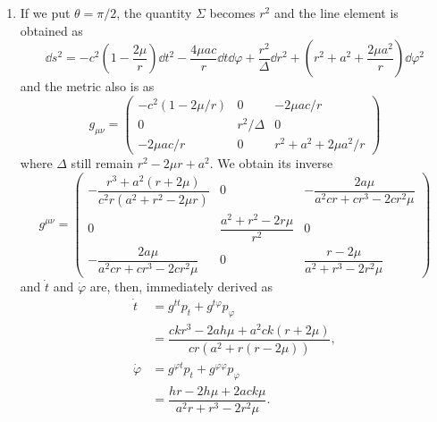 \documentclass[a4paper,pdftex,10pt]{article}
\begin{document}
\maketitle

\begin{enumerate}
  \item
        If we put $\theta=\pi/2$, the quantity $\Sigma$ becomes $r^2$ and the line element is obtained as
        \begin{equation}
          \dd s^2
          =
          -
          c^2
          \left( 1-\frac{2\mu}{r} \right)\dd t^2
          -
          \frac{4\mu ac}{r}\dd t\dd \varphi
          +
          \frac{r^2}{\Delta}\dd r^2
          +
          \left(
          r^2+a^2+\frac{2\mu a^2}{r}
          \right)
          \dd\varphi^2
        \end{equation}
        and the metric also is as
        \begin{equation}
          g_{\mu\nu}
          =
          \begin{pmatrix}
            -c^2(1-2\mu/r) & 0          & -2\mu ac/r           \\
            0              & r^2/\Delta & 0                    \\
            -2\mu ac/r     & 0          & r^2 + a^2 +2\mu a^2/r
          \end{pmatrix}
        \end{equation}
        where $\Delta$ still remain $r^2-2\mu r+a^2$. We obtain its inverse
        \begin{equation}
          g^{\mu\nu}
          =
          \begin{pmatrix}
            -\dfrac{r^3+a^2(r+2\mu)}{c^2 r(a^2+r^2-2\mu r)} & 0 & -\dfrac{2a\mu}{a^2 cr+cr^3-2cr^2\mu} \\
            0 & \dfrac{a^2+r^2-2r\mu}{r^2} & 0 \\
            -\dfrac{2a\mu}{a^2cr+cr^3-2cr^2\mu} & 0 & \dfrac{r-2\mu}{a^2+r^3-2r^2\mu}
          \end{pmatrix}
          \label{eqn:inverse_metric}
        \end{equation}
        and $\dot{t}$ and $\dot{\varphi}$ are, then, immediately derived as
        \begin{align}
          \dot{t}
          &=
          g^{tt}p_{t}+g^{t\varphi}p_{\varphi}
          \nonumber
          \\
          &=
          \dfrac{ckr^3-2ah\mu+a^2 ck(r+2\mu)}{cr(a^2+r(r-2\mu))}
          ,
          \\
          \dot{\varphi}
          &=
          g^{\varphi t}p_{t}+g^{\varphi\varphi}p_{\varphi}
          \nonumber
          \\
          &=
          \dfrac{hr-2h\mu+2ack\mu}{a^2r+r^3-2r^2\mu}
          .
        \end{align}



\end{enumerate}
\end{document}

